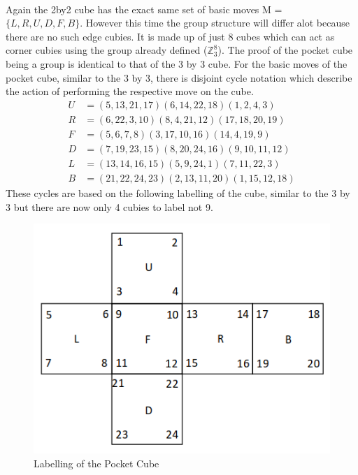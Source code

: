\documentclass{article}
\begin{document}
\paragraph*{}
Again the 2by2 cube has the exact same set of basic moves M = $\{L,R,U,D,F,B\}$. However this time the group structure will differ alot because there are no such edge cubies. It is made up of just 8 cubes which can act as corner cubies using the group already defined ($\mathbb{Z}_{3}^{8}$). The proof of the pocket cube being a group is identical to that of the 3 by 3 cube.
For the basic moves of the pocket cube, similar to the 3 by 3, there is disjoint cycle notation which describe the action of performing the respective move on the cube. 
\begin{align*}
U&=(5,13,21,17)(6,14,22,18)(1,2,4,3)\\
R&=(6,22,3,10)(8,4,21,12)(17,18,20,19)\\
F&=(5,6,7,8)(3,17,10,16)(14,4,19,9)\\
D&=(7,19,23,15)(8,20,24,16)(9,10,11,12)\\
L&=(13,14,16,15)(5,9,24,1)(7,11,22,3)\\
B&= (21,22,24,23)(2,13,11,20)(1,15,12,18)
\end{align*}
These cycles are based on the following labelling of the cube, similar to the 3 by 3 but there are now only 4 cubies to label not 9.
\begin{figure}[hbt]
\label{fig:2labelling}
\includegraphics[scale=.5]{2by2.png}
\caption{Labelling of the Pocket Cube}
\end{figure}
\end{document}
